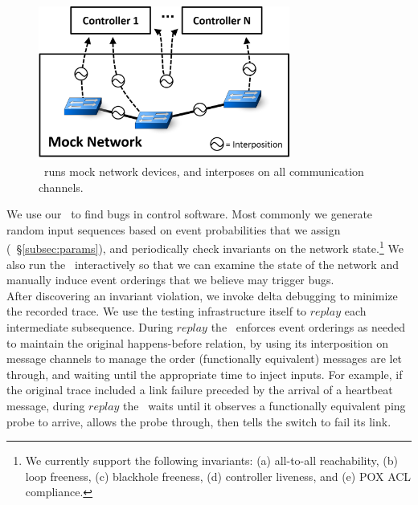 \begin{figure}[tb]
    \includegraphics[width=3.25in]{../diagrams/architecture/Debugger_Architecture.png}
    \caption[]{\label{fig:architecture} \projectname~runs mock
    network devices, and interposes on all communication
    channels.}
    \vspace{-1em}
\end{figure}

We use our \tester~to find bugs in control software.
Most commonly we generate random input
sequences based on event probabilities that we assign (\cf~\S\ref{subsec:params}), and periodically
check invariants on the network state.\footnote{We currently support the following invariants:
  (a) all-to-all reachability, (b) loop freeness, (c) blackhole freeness, (d) controller
liveness, and (e) POX ACL compliance.
}
We also run the \tester~interactively
so that we can examine the state of the network
and manually induce event orderings that we believe may trigger bugs.\\[0.5ex]
%
 After discovering an invariant
violation, we invoke delta debugging to minimize the recorded trace. We use the
testing infrastructure itself to $replay$ each intermediate subsequence.
During $replay$ the \tester~enforces event orderings as needed to maintain the original happens-before
relation, by using its interposition on message channels to
manage the order (functionally equivalent) messages are let through,
and waiting until the appropriate time to inject inputs. For example, if the
original trace included a link failure preceded by the arrival of a heartbeat
message, during $replay$ the \tester~waits until it observes
a functionally equivalent ping probe to arrive, allows the probe
through, then tells the switch to fail its link. %

